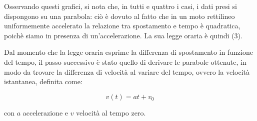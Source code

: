 \documentclass[a4paper,11pt,titlepage]{book}
\begin{document}
\begin{flushleft}
Osservando questi grafici, si nota che, in tutti e quattro i casi, i dati presi si dispongono su una parabola: ciò è dovuto al fatto che in un moto rettilineo uniformemente accelerato la relazione tra spostamento e tempo è quadratica, poichè siamo in presenza di un’accelerazione. La sua legge oraria è quindi (3).
\end{flushleft}
\newpage


\begin{flushleft}
Dal momento che la legge oraria esprime la differenza di spostamento in funzione del tempo, il passo successivo è stato quello di derivare le parabole ottenute, in modo da trovare la differenza di velocità al variare del tempo, ovvero la velocità istantanea, definita come:
\end{flushleft}

\begin{equation}
v(t)=at+v_0
\end{equation}
\vspace{0.2cm}

\begin{flushleft}
con $a$ accelerazione e $v$ velocità al tempo zero.
\end{flushleft}







\begin{figure}[h!]
\hspace{0.2cm}
 \\
\hspace{0.2cm}
\end{figure}
\newpage
\end{document}
